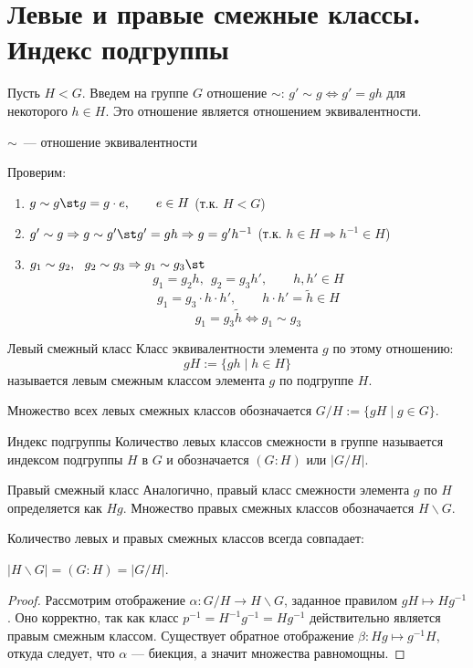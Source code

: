 
\section{Левые и правые смежные классы. Индекс подгруппы}

Пусть $H < G$. Введем на группе $G$ отношение $\sim$: $g' \sim g \Leftrightarrow g' = gh$ для некоторого $h \in H$. Это отношение является отношением эквивалентности.

\begin{Statement}{$\sim$~--- отношение эквивалентности}{}
	
	Проверим:
	
	\begin{enumerate}
		\item $g \sim g \st g = g\cdot e, \qquad e \in H$ (т.к. $H < G$)
		\item $g' \sim g \Rightarrow g \sim g' \st g' = gh \Rightarrow g = g'h^{-1}$ (т.к. $h\in H \Rightarrow h^{-1} \in H$)
		\item $g_1 \sim g_2, \ \ g_2 \sim g_3 \Rightarrow g_1 \sim g_3 \st$
		\[ g_1 = g_2h, \ \ g_2 = g_3h', \qquad h, h' \in H\]
		\[ g_1 = g_3\cdot h\cdot h', \qquad h\cdot h' = \tilde{h} \in H\]
		\[ g_1 = g_3 \tilde{h} \Leftrightarrow g_1 \sim g_3 \]
	\end{enumerate}
\end{Statement}

\begin{Definition}{Левый смежный класс}{}
	Класс эквивалентности элемента $g$ по этому отношению:
	\[
	gH := \{ gh \mid h \in H \}
	\]
	называется левым смежным классом элемента $g$ по подгруппе $H$.
\end{Definition}

Множество всех левых смежных классов обозначается $G/H := \{ gH \mid g \in G \}$.

\begin{Definition}{Индекс подгруппы}{}
	Количество левых классов смежности в группе называется индексом подгруппы $H$ в $G$ и обозначается $(G:H)$ или $|G/H|$.
\end{Definition}

\begin{Definition}{Правый смежный класс}{}
	Аналогично, правый класс смежности элемента $g$ по $H$ определяется как $Hg$. Множество правых смежных классов обозначается $H \backslash G$.
\end{Definition}

Количество левых и правых смежных классов всегда совпадает:
\begin{Proposition}{}{}
	$|H \backslash G| = (G:H) = |G \slash H|$.
\end{Proposition}
\begin{proof}
	Рассмотрим отображение $\alpha\colon G \slash H \to H \backslash G$, заданное правилом $gH \mapsto Hg^{-1}$. Оно корректно, так как класс $p^{-1} = H^{-1}g^{-1} = Hg^{-1}$ действительно является правым смежным классом.
	Существует обратное отображение $\beta \colon Hg \mapsto g^{-1}H$, откуда следует, что $\alpha$ --- биекция, а значит множества равномощны.
\end{proof}
